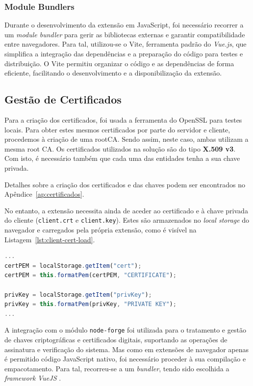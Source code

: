 \subsubsection{Module Bundlers}

Durante o desenvolvimento da extensão em JavaScript, foi necessário recorrer a um \textit{module bundler} para gerir as bibliotecas externas e garantir compatibilidade entre navegadores. Para tal, utilizou-se o Vite, ferramenta padrão do \textit{Vue.js}, que simplifica a integração das dependências e a preparação do código para testes e distribuição. O Vite permitiu organizar o código e as dependências de forma eficiente, facilitando o desenvolvimento e a disponibilização da extensão.

\subsection{Gestão de Certificados}
Para a criação dos certificados, foi usada a ferramenta do OpenSSL para testes locais. Para obter estes mesmos certificados por parte do servidor e cliente, procedemos à criação de uma rootCA. Sendo assim, neste caso, ambas utilizam a mesma root CA. Os certificados utilizados na solução são do tipo \textbf{X.509 v3}. Com isto, é necessário também que cada uma das entidades tenha a sua chave privada.

Detalhes sobre a criação dos certificados e das chaves podem ser encontrados no Apêndice~\ref{ap:certificados}.

No entanto, a extensão necessita ainda de aceder ao certificado e à chave privada do cliente (\texttt{client.crt} e \texttt{client.key}). Estes são armazenados no \textit{local storage} do navegador e carregados pela própria extensão, como é visível na Listagem~\ref{lst:client-cert-load}.

\begin{lstlisting}[language=Javascript, caption={Carregamento do certificado e da chave privada do cliente a partir do \textit{local storage}}, label={lst:client-cert-load}]
...
certPEM = localStorage.getItem("cert");
certPEM = this.formatPem(certPEM, "CERTIFICATE");

privKey = localStorage.getItem("privKey");
privKey = this.formatPem(privKey, "PRIVATE KEY");
...
\end{lstlisting}

A integração com o módulo \texttt{node-forge} foi utilizada para o tratamento e gestão de chaves criptográficas e certificados digitais, suportando as operações de assinatura e verificação do sistema. Mas como em extensões de navegador apenas é permitido código JavaScript nativo, foi necessário proceder à sua compilação e empacotamento. Para tal, recorreu-se a um \textit{bundler}, tendo sido escolhida a \textit{framework} \textit{VueJS} \citep{VueJS}.

